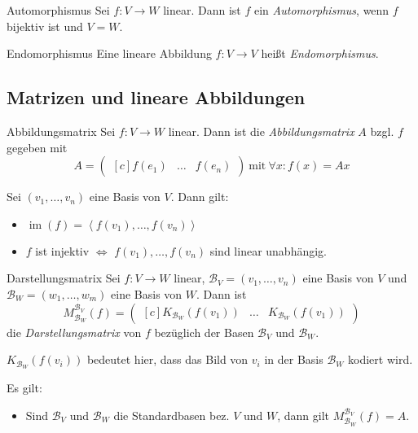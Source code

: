 \documentclass[german]{../spicker}
\newcommand{\scalarprod}[1]{\left\langle #1 \right\rangle}
\newcommand{\vektor}[1]{\begin{pmatrix*}[c] #1 \end{pmatrix*}}
\newcommand{\im}{\operatorname{im}}
\begin{document}
\begin{defi}{Automorphismus}
    Sei $f : V \to W$ linear.
    Dann ist $f$ ein \emph{Automorphismus}, wenn $f$ bijektiv ist und $V = W$.
\end{defi}

\begin{defi}{Endomorphismus}
    Eine lineare Abbildung $f : V \to V$ heißt \emph{Endomorphismus}.
\end{defi}

\subsection{Matrizen und lineare Abbildungen}

\begin{defi}{Abbildungsmatrix}
    Sei $f : V \to W$ linear. Dann ist die \emph{Abbildungsmatrix} $A$ bzgl. $f$ gegeben mit
    $$
        A = \vektor{f(e_1) & \ldots & f(e_n)} \ \text{mit} \ \forall x : f(x) = Ax
    $$

    Sei $(v_1, \ldots, v_n)$ eine Basis von $V$. Dann gilt:
    \begin{itemize}
        \item $\im(f) = \scalarprod{f(v_1), \ldots, f(v_n)}$
        \item $f$ ist injektiv $\iff$ $f(v_1), \ldots, f(v_n)$ sind linear unabhängig.
    \end{itemize}
\end{defi}

\begin{defi}{Darstellungsmatrix}
    Sei $f : V \to W$ linear, $\mathcal{B}_V = (v_1, \ldots, v_n)$ eine Basis von $V$ und $\mathcal{B}_W = (w_1, \ldots, w_m)$ eine Basis von $W$.
    Dann ist
    $$
        M^{\mathcal{B}_V}_{\mathcal{B}_W} (f) = \vektor{K_{\mathcal{B}_W}(f(v_1)) & \ldots & K_{\mathcal{B}_W}(f(v_1))}
    $$
    die \emph{Darstellungsmatrix} von $f$ bezüglich der Basen $\mathcal{B}_V$ und $\mathcal{B}_W$.

    $K_{\mathcal{B}_W}(f(v_i))$ bedeutet hier, dass das Bild von $v_i$ in der Basis $\mathcal{B}_W$ kodiert wird.

    Es gilt:
    \begin{itemize}
        \item Sind $\mathcal{B}_V$ und $\mathcal{B}_W$ die Standardbasen bez. $V$ und $W$, dann gilt $M^{\mathcal{B}_V}_{\mathcal{B}_W} (f) = A$.
    \end{itemize}
\end{defi}
\end{document}
